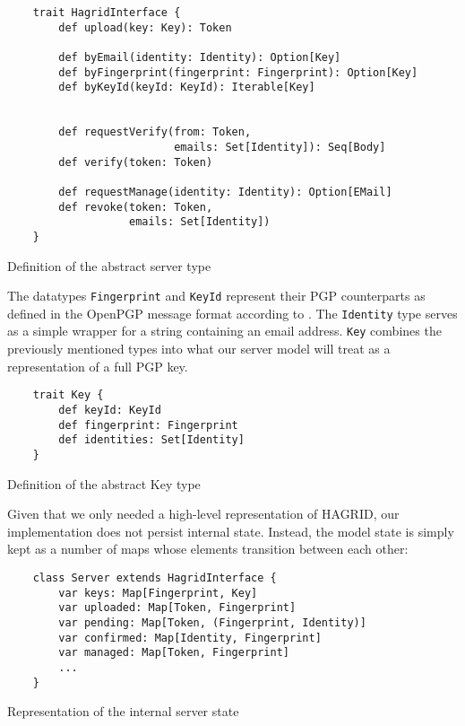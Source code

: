 \begin{code}
    \begin{verbatim}
    trait HagridInterface {
        def upload(key: Key): Token

        def byEmail(identity: Identity): Option[Key]
        def byFingerprint(fingerprint: Fingerprint): Option[Key]
        def byKeyId(keyId: KeyId): Iterable[Key]

        
        def requestVerify(from: Token, 
                          emails: Set[Identity]): Seq[Body]
        def verify(token: Token)

        def requestManage(identity: Identity): Option[EMail]
        def revoke(token: Token, 
                   emails: Set[Identity])
    }
    \end{verbatim}
        \caption{Definition of the abstract server type}
        \label{def:HagridInterface}
\end{code}

The datatypes \texttt{Fingerprint} and \texttt{KeyId} represent their PGP counterparts as defined in the OpenPGP message format according to \cite{callas1998openpgp}. The \texttt{Identity} type serves as a simple wrapper for a string containing an email address. \texttt{Key} combines the previously mentioned types into what our server model will treat as a representation of a full PGP key.
\begin{code}
    \begin{verbatim}
    trait Key {
        def keyId: KeyId
        def fingerprint: Fingerprint
        def identities: Set[Identity]
    }
    \end{verbatim}
\caption{Definition of the abstract Key type}
\end{code}

Given that we only needed a high-level representation of HAGRID, our implementation does not persist internal state. Instead, the model state is simply kept as a number of maps whose elements transition between each other: 
\begin{code}
    \begin{verbatim}
    class Server extends HagridInterface {
        var keys: Map[Fingerprint, Key]
        var uploaded: Map[Token, Fingerprint]
        var pending: Map[Token, (Fingerprint, Identity)]
        var confirmed: Map[Identity, Fingerprint]
        var managed: Map[Token, Fingerprint]
        ...
    }
    \end{verbatim} 
    \caption{Representation of the internal server state}
\end{code}


